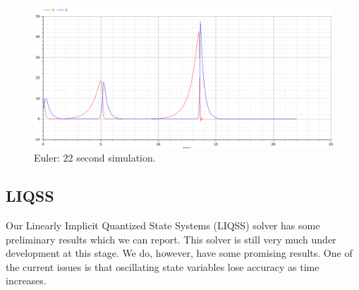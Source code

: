 \documentclass[10pt]{article}
\begin{document}
\begin{figure}[htbp]
\begin{center}
\includegraphics[scale=0.26]{Selection_055.png}
\end{center}
\vspace{-0.5cm}

\caption{Euler: 22 second simulation.}
\end{figure}


\subsection{LIQSS}

Our Linearly Implicit Quantized State Systems (LIQSS) solver has some preliminary results which we can report. This solver is still very much under development at this stage. We do, however, have some promising results. One of the current issues is that oscillating state variables lose accuracy as time increases.
\end{document}
